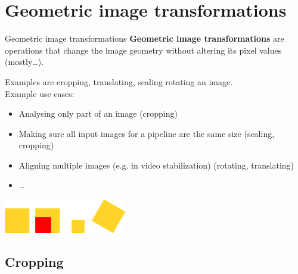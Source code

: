 \documentclass[9pt, aspectratio=169]{beamer}
\begin{document}
\section{Geometric image transformations}

\begin{frame}
    {Geometric image transformations}
    \textbf{Geometric image transformations} are operations that change the image geometry without altering its pixel values (mostly\dots).

    Examples are cropping, translating, scaling rotating an image.\\
    \pause
    Example use cases:

    \begin{itemize}
        \item Analysing only part of an image (cropping)
        \item Making sure all input images for a pipeline are the same size (scaling, cropping)
        \item Aligning multiple images (e.g. in video stabilization) (rotating, translating)
        \item \dots
    \end{itemize}
    \begin{center}
        \includegraphics[width=0.4\textwidth]{basic_manipulation.png}
    \end{center}
\end{frame}

\subsection{Cropping}
\end{document}
